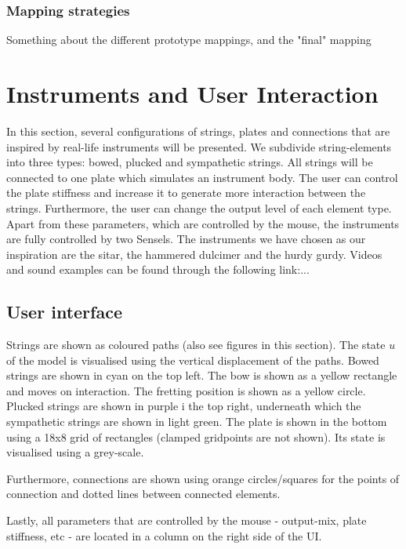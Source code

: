 \documentclass{article}
\begin{document}
\subsubsection{Mapping strategies}
Something about the different prototype mappings, and the "final" mapping 



\section{Instruments and User Interaction}\label{sec:instruments}
In this section, several configurations of strings, plates and connections that are inspired by real-life instruments will be presented. We subdivide string-elements into three types: bowed, plucked and sympathetic strings. All strings will be connected to one plate which simulates an instrument body. The user can control the plate stiffness and increase it to generate more interaction between the strings. Furthermore, the user can change the output level of each element type. Apart from these parameters, which are controlled by the mouse, the instruments are fully controlled by two Sensels. The instruments we have chosen as our inspiration are the sitar, the hammered dulcimer and the hurdy gurdy. Videos and sound examples can be found through the following link:...

\subsection{User interface}
Strings are shown as coloured paths (also see figures in this section). The state $u$ of the model is visualised using the vertical displacement of the paths. Bowed strings are shown in cyan on the top left. The bow is shown as a yellow rectangle and moves on interaction. The fretting position is shown as a yellow circle. Plucked strings are shown in purple i the top right, underneath which the sympathetic strings are shown in light green. The plate is shown in the bottom using a 18x8 grid of rectangles (clamped gridpoints are not shown). Its state is visualised using a grey-scale.

Furthermore, connections are shown using orange circles/squares for the points of connection and dotted lines between connected elements.

Lastly, all parameters that are controlled by the mouse - output-mix, plate stiffness, etc - are located in a column on the right side of the UI.
\end{document}
